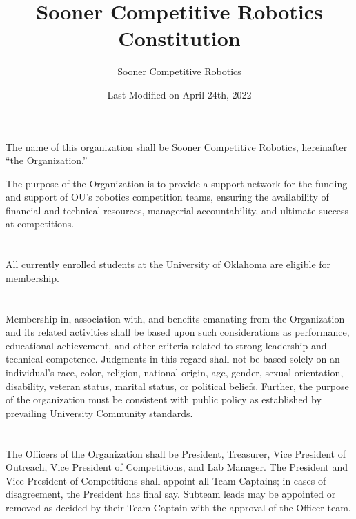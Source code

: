 \documentclass[12pt]{cls/constitution}
\begin{document}
\title{Sooner Competitive Robotics Constitution}
\author{Sooner Competitive Robotics}
\date{Last Modified on April 24th, 2022}
\maketitle
\setcounter{tocdepth}{0}
\tableofcontents
\newpage


The name of this organization shall be Sooner Competitive Robotics, hereinafter “the Organization.”


The purpose of the Organization is to provide a support network for the funding and support of OU's robotics competition teams, ensuring the availability of financial and technical resources, managerial accountability, and ultimate success at competitions.


\section{}
All currently enrolled students at the University of Oklahoma are eligible for membership. 

\section{}
Membership in, association with, and benefits emanating from the Organization and its related activities shall be based upon such considerations as performance, educational achievement, and other criteria related to strong leadership and technical competence. Judgments in this regard shall not be based solely on an individual’s race, color, religion, national origin, age, gender, sexual orientation, disability, veteran status, marital status, or political beliefs. Further, the purpose of the organization must be consistent with public policy as established by prevailing University Community standards.  


\section{}
The Officers of the Organization shall be President, Treasurer, Vice President of Outreach, Vice President of Competitions, and Lab Manager.
The President and Vice President of Competitions shall appoint all Team Captains; in cases of disagreement, the President has final say.
Subteam leads may be appointed or removed as decided by their Team Captain with the approval of the Officer team.
\end{document}
